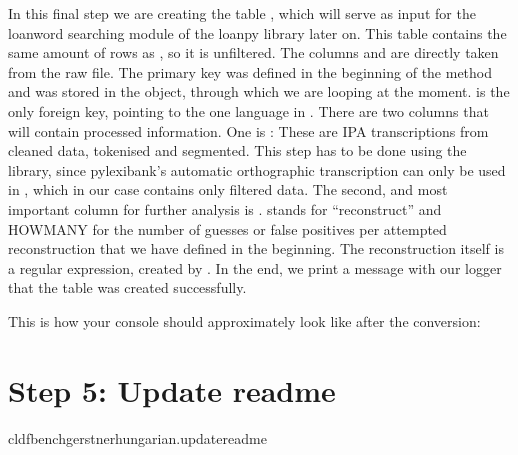 \documentclass[letterpaper,10pt,english]{sphinxmanual}
\begin{document}
\sphinxAtStartPar
In this final step we are creating the table , which
will serve as input for the loanword searching module of the loanpy library
later on. This
table contains the same amount of rows as , so
it is unfiltered. The columns    and 
are directly taken from the raw file. The primary key  was
defined in the beginning of the  method and was stored in the
 object, through which we are looping at the moment. 
is the only foreign key, pointing to the one language in
. There are two columns that will contain processed
information. One is : These are IPA transcriptions from cleaned
data, tokenised and segmented. This
step has to be done using the 
library, since pylexibank’s automatic orthographic transcription can only be
used in , which in our case contains only filtered data.
The second, and most important column for further analysis is .
 stands for “reconstruct” and HOWMANY for the number of guesses or false
positives per attempted reconstruction that we have defined in the beginning.
The reconstruction itself is a regular
expression, created by .
In the end, we print a message with our logger that the table was created
successfully.

\sphinxAtStartPar
This is how your console should approximately look like after the conversion:

\noindent{}


\section{Step 5: Update readme}
\label{\detokenize{mkcldf:step-5-update-readme}}
\begin{sphinxVerbatim}[commandchars=\\\{\}]
cldfbenchgerstnerhungarian.update\PYGZus{}readme
\end{sphinxVerbatim}
\end{document}
